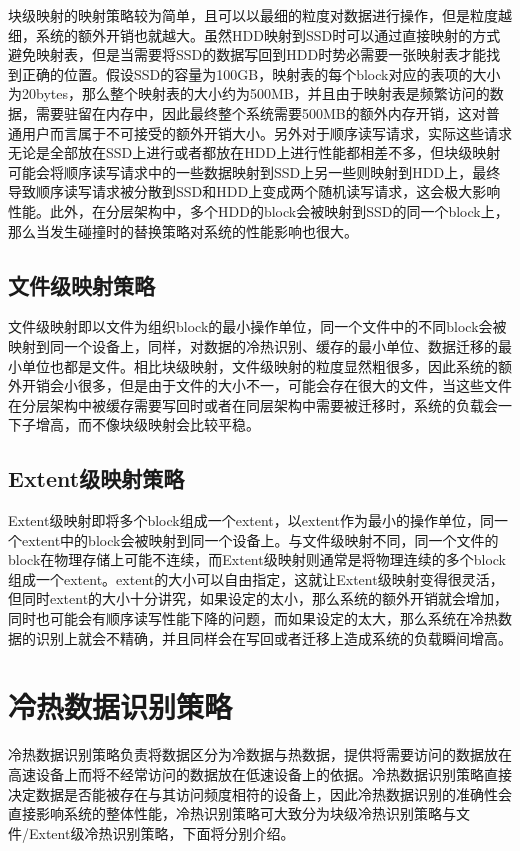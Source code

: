 块级映射的映射策略较为简单，且可以以最细的粒度对数据进行操作，但是粒度越细，系统的额外开销也就越大。虽然HDD映射到SSD时可以通过直接映射的方式避免映射表，但是当需要将SSD的数据写回到HDD时势必需要一张映射表才能找到正确的位置。假设SSD的容量为100GB，映射表的每个block对应的表项的大小为20bytes，那么整个映射表的大小约为500MB，并且由于映射表是频繁访问的数据，需要驻留在内存中，因此最终整个系统需要500MB的额外内存开销，这对普通用户而言属于不可接受的额外开销大小。另外对于顺序读写请求，实际这些请求无论是全部放在SSD上进行或者都放在HDD上进行性能都相差不多，但块级映射可能会将顺序读写请求中的一些数据映射到SSD上另一些则映射到HDD上，最终导致顺序读写请求被分散到SSD和HDD上变成两个随机读写请求，这会极大影响性能。此外，在分层架构中，多个HDD的block会被映射到SSD的同一个block上，那么当发生碰撞时的替换策略对系统的性能影响也很大。

\subsection{文件级映射策略}

文件级映射即以文件为组织block的最小操作单位，同一个文件中的不同block会被映射到同一个设备上，同样，对数据的冷热识别、缓存的最小单位、数据迁移的最小单位也都是文件。相比块级映射，文件级映射的粒度显然粗很多，因此系统的额外开销会小很多，但是由于文件的大小不一，可能会存在很大的文件，当这些文件在分层架构中被缓存需要写回时或者在同层架构中需要被迁移时，系统的负载会一下子增高，而不像块级映射会比较平稳。

\subsection{Extent级映射策略}

Extent级映射即将多个block组成一个extent，以extent作为最小的操作单位，同一个extent中的block会被映射到同一个设备上。与文件级映射不同，同一个文件的block在物理存储上可能不连续，而Extent级映射则通常是将物理连续的多个block组成一个extent。extent的大小可以自由指定，这就让Extent级映射变得很灵活，但同时extent的大小十分讲究，如果设定的太小，那么系统的额外开销就会增加，同时也可能会有顺序读写性能下降的问题，而如果设定的太大，那么系统在冷热数据的识别上就会不精确，并且同样会在写回或者迁移上造成系统的负载瞬间增高。

\section{冷热数据识别策略}

冷热数据识别策略负责将数据区分为冷数据与热数据，提供将需要访问的数据放在高速设备上而将不经常访问的数据放在低速设备上的依据。冷热数据识别策略直接决定数据是否能被存在与其访问频度相符的设备上，因此冷热数据识别的准确性会直接影响系统的整体性能，冷热识别策略可大致分为块级冷热识别策略与文件/Extent级冷热识别策略，下面将分别介绍。

